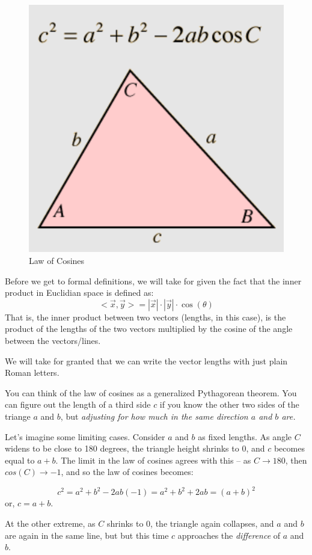 \documentclass[
]{book}
\begin{document}
\begin{figure}

{\centering \includegraphics[width=0.5\linewidth,height=0.5\textheight]{images/law-of-cosines} 

}

\caption{Law of Cosines}\label{fig:unnamed-chunk-9}
\end{figure}

Before we get to formal definitions, we will take for given the fact that the inner product in Euclidian space is defined as:
\[<\vec{x},\vec{y}> = |\vec{x}| \cdot |\vec{y}| \cdot \cos(\theta)\]
That is, the inner product between two vectors (lengths, in this case), is the product of the lengths of the two vectors multiplied by the cosine of the angle between the vectors/lines.

We will take for granted that we can write the vector lengths with just plain Roman letters.

You can think of the law of cosines as a generalized Pythagorean theorem. You can figure out the length of a third side \(c\) if you know the other two sides of the triange \(a\) and \(b\), but \emph{adjusting for how much in the same direction \(a\) and \(b\) are.}

Let's imagine some limiting cases. Consider \(a\) and \(b\) as fixed lengths. As angle \(C\) widens to be close to 180 degrees, the triangle height shrinks to 0, and \(c\) becomes equal to \(a + b\). The limit in the law of cosines agrees with this -- as \(C \rightarrow 180\), then \(cos(C) \rightarrow -1\), and so the law of cosines becomes:

\[c^2 = a^2 + b^2 - 2 a b (-1) = a^2 + b^2 + 2 a b = (a + b)^2\]
or, \(c = a + b\).

At the other extreme, as \(C\) shrinks to 0, the triangle again collapses, and \(a\) and \(b\) are again in the same line, but but this time \(c\) approaches the \emph{difference} of \(a\) and \(b\).
\end{document}
